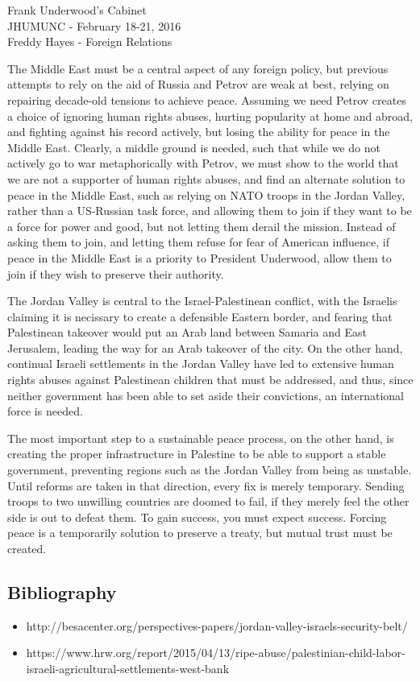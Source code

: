 \documentclass[12pt]{article}
\begin{document}
\begin{flushleft}
Frank Underwood's Cabinet \\
JHUMUNC - February 18-21, 2016 \\
Freddy Hayes - Foreign Relations
\end{flushleft}

The Middle East must be a central aspect of any foreign policy, but previous attempts to rely on the aid of Russia and Petrov are weak at best, relying on repairing decade-old tensions to achieve peace. Assuming we need Petrov creates a choice of ignoring human rights abuses, hurting popularity at home and abroad, and fighting against his record actively, but losing the ability for peace in the Middle East. Clearly, a middle ground is needed, such that while we do not actively go to war metaphorically with Petrov, we must show to the world that we are not a supporter of human rights abuses, and find an alternate solution to peace in the Middle East, such as relying on NATO troops in the Jordan Valley, rather than a US-Russian task force, and allowing them to join if they want to be a force for power and good, but not letting them derail the mission. Instead of asking them to join, and letting them refuse for fear of American influence, if peace in the Middle East is a priority to President Underwood, allow them to join if they wish to preserve their authority.

The Jordan Valley is central to the Israel-Palestinean conflict, with the Israelis claiming it is necissary to create a defensible Eastern border, and fearing that Palestinean takeover would put an Arab land between Samaria and East Jerusalem, leading the way for an Arab takeover of the city. On the other hand, continual Israeli settlements in the Jordan Valley have led to extensive human rights abuses against Palestinean children that must be addressed, and thus, since neither government has been able to set aside their convictions, an international force is needed.

The most important step to a sustainable peace process, on the other hand, is creating the proper infrastructure in Palestine to be able to support a stable government, preventing regions such as the Jordan Valley from being as unstable. Until reforms are taken in that direction, every fix is merely temporary. Sending troops to two unwilling countries are doomed to fail, if they merely feel the other side is out to defeat them. To gain success, you must expect success. Forcing peace is a temporarily solution to preserve a treaty, but mutual trust must be created.

\newpage
\subsection*{Bibliography}
\begin{itemize}
\item http://besacenter.org/perspectives-papers/jordan-valley-israels-security-belt/
\item https://www.hrw.org/report/2015/04/13/ripe-abuse/palestinian-child-labor-israeli-agricultural-settlements-west-bank
\end{itemize}
\end{document}
